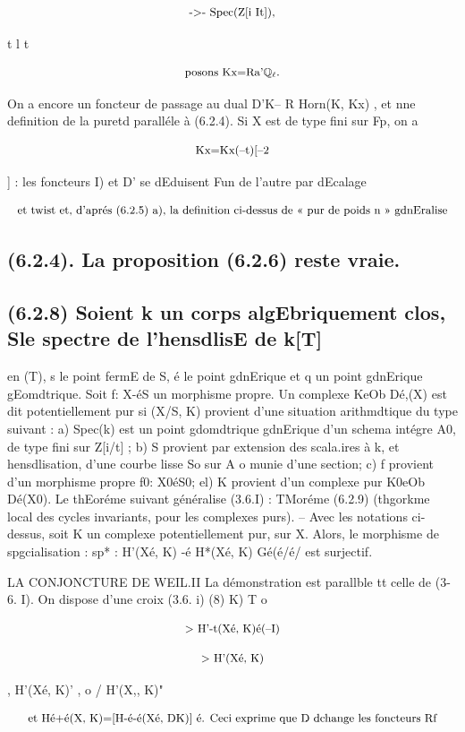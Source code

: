 \documentclass[11pt]{article}
\theoremstyle{remark}
\begin{document}
\[\text{\small ->- Spec(Z[i It]),}\]

t l t

\[\text{\small posons Kx=Ra'\(\mathbb{Q}_{\ell}\).}\]

On a encore un foncteur de passage au dual D'K-- R Horn(K, Kx) , et nne definition de la puretd paralléle à (6.2.4). Si X est de type fini sur Fp, on a

\[\text{\small Kx=Kx(--t)[--2}\]

] : les foncteurs I) et D' se dEduisent Fun de l'autre par dEcalage

\[\text{\small et twist et, d'aprés (6.2.5) a), la definition ci-dessus de << pur de poids n >> gdnEralise}\]

\subsection*{(6.2.4). La proposition (6.2.6) reste vraie.}

\subsection*{(6.2.8) Soient k un corps algEbriquement clos, Sle spectre de l'hensdlisE de k[T]}

en (T), s le point fermE de S, é le point gdnErique et q un point gdnErique gEomdtrique. Soit f: X-éS un morphisme propre. Un complexe KeOb Dé,(X) est dit potentiellement pur si (X/S, K) provient d'une situation arithmdtique du type suivant : a) Spec(k) est un point gdomdtrique gdnErique d'un schema intégre A0, de type fini sur Z[i/t] ; b) S provient par extension des scala.ires à k, et hensdlisation, d'une courbe lisse So sur A o munie d'une section; c) f provient d'un morphisme propre f0: X0éS0; el) K provient d'un complexe pur K0eOb Dé(X0). Le thEoréme suivant généralise (3.6.I) : TMoréme (6.2.9) (thgorkme local des cycles invariants, pour les complexes purs). -- Avec les notations ci-dessus, soit K un complexe potentiellement pur, sur X. Alors, le morphisme de spgcialisation : sp* : H'(Xé, K) -é H*(Xé, K) Gé(é/é/ est surjectif.

LA CONJONCTURE DE WEIL.II La démonstration est parallble tt celle de (3- 6. I). On dispose d'une croix (3.6. i) (8) K) T o

\[\text{\small > H'-t(Xé, K)é(--I)}\]

\[\text{\small > H'(Xé, K)}\]

, H'(Xé, K)' , o / H'(X,, K)"

\[\text{\small et Hé+é(X, K)=[H-é-é(Xé, DK)] é. Ceci exprime que D dchange les foncteurs Rf}\]
\end{document}
